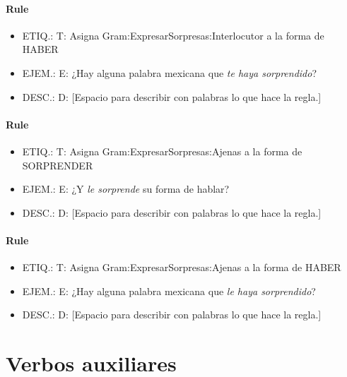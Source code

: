 \documentclass[11pt]{report}
\begin{document}
\paragraph*{Rule}
\begin{itemize}
\item ETIQ.:  T: Asigna Gram:ExpresarSorpresas:Interlocutor a la forma de HABER
\item EJEM.:  E: ¿Hay alguna palabra mexicana que \emph{te haya sorprendido}?
\item DESC.:  D: [Espacio para describir con palabras lo que hace la regla.]
\end{itemize}

\paragraph*{Rule}
\begin{itemize}
\item ETIQ.:  T: Asigna Gram:ExpresarSorpresas:Ajenas a la forma de SORPRENDER
\item EJEM.:  E: ¿Y \emph{le sorprende} su forma de hablar?
\item DESC.:  D: [Espacio para describir con palabras lo que hace la regla.]
\end{itemize}

\paragraph*{Rule}
\begin{itemize}
\item ETIQ.:  T: Asigna Gram:ExpresarSorpresas:Ajenas a la forma de HABER
\item EJEM.:  E: ¿Hay alguna palabra mexicana que \emph{le haya sorprendido}?
\item DESC.:  D: [Espacio para describir con palabras lo que hace la regla.]
\end{itemize}

\section{Verbos auxiliares}
\end{document}
